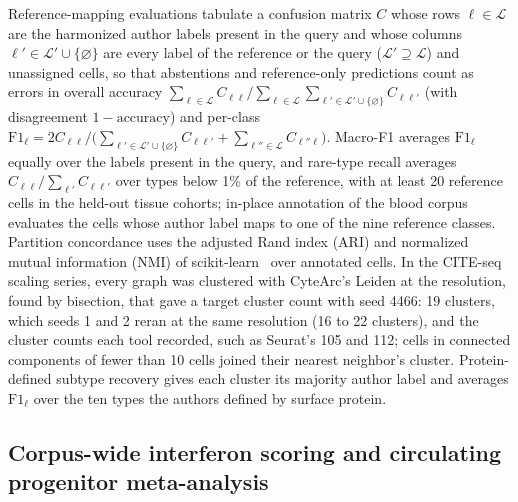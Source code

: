 \documentclass[11pt]{article}
\begin{document}
Reference-mapping evaluations tabulate a confusion matrix $C$ whose rows $\ell\in\mathcal{L}$ are the harmonized author labels present in the query and whose columns $\ell'\in\mathcal{L}'\cup\{\varnothing\}$ are every label of the reference or the query ($\mathcal{L}'\supseteq\mathcal{L}$) and unassigned cells, so that abstentions and reference-only predictions count as errors in overall accuracy $\sum_{\ell\in\mathcal{L}}C_{\ell\ell}/\sum_{\ell\in\mathcal{L}}\sum_{\ell'\in\mathcal{L}'\cup\{\varnothing\}}C_{\ell\ell'}$ (with disagreement $1-\mathrm{accuracy}$) and per-class $\mathrm{F1}_{\ell}=2C_{\ell\ell}/\bigl(\sum_{\ell'\in\mathcal{L}'\cup\{\varnothing\}}C_{\ell\ell'}+\sum_{\ell''\in\mathcal{L}}C_{\ell''\ell}\bigr)$. Macro-F1 averages $\mathrm{F1}_{\ell}$ equally over the labels present in the query, and rare-type recall averages $C_{\ell\ell}/\sum_{\ell'}C_{\ell\ell'}$ over types below 1\% of the reference, with at least 20 reference cells in the held-out tissue cohorts; in-place annotation of the blood corpus evaluates the cells whose author label maps to one of the nine reference classes. Partition concordance uses the adjusted Rand index (ARI) and normalized mutual information (NMI) of scikit-learn~\cite{pedregosa2012scikitlearn} over annotated cells. In the CITE-seq scaling series, every graph was clustered with CyteArc's Leiden at the resolution, found by bisection, that gave a target cluster count with seed 4466: 19 clusters, which seeds 1 and 2 reran at the same resolution (16 to 22 clusters), and the cluster counts each tool recorded, such as Seurat's 105 and 112; cells in connected components of fewer than 10 cells joined their nearest neighbor's cluster. Protein-defined subtype recovery gives each cluster its majority author label and averages $\mathrm{F1}_{\ell}$ over the ten types the authors defined by surface protein.

\subsection*{Corpus-wide interferon scoring and circulating progenitor meta-analysis}\label{sec:Corpus models}
\end{document}
